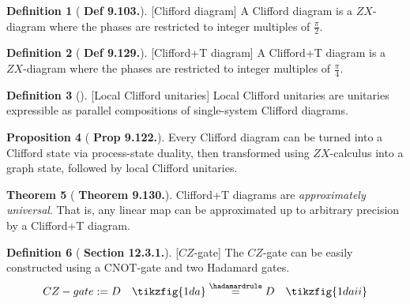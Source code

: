 \documentclass[11pt]{article} %
\theoremstyle{definition}
\newtheorem{theorem}{Theorem}[section]
\newtheorem{corollary}[theorem]{Corollary}
\newtheorem{proposition}[theorem]{Proposition}
\newtheorem{definition}[theorem]{Definition}
\begin{document}
\begin{definition}[{\cite{coecke2017picturing} \textbf{Def 9.103.}}][Clifford diagram]
A Clifford diagram is a $ZX$-diagram where the phases are restricted to integer multiples of $\frac{\pi}{2}$.
\label{def:2}
\end{definition}

\begin{definition}[{\cite{coecke2017picturing} \textbf{Def 9.129.}}][Clifford+T diagram]
A Clifford+T diagram is a $ZX$-diagram where the phases are restricted to integer multiples of $\frac{\pi}{4}$.
\label{def:3}
\end{definition}

\begin{definition}[{\cite{coecke2017picturing}}][Local Clifford unitaries]
Local Clifford unitaries are unitaries expressible as parallel compositions of single-system Clifford diagrams.
\label{def:4}
\end{definition}

\begin{proposition}[{\cite{coecke2017picturing} \textbf{Prop 9.122.}}]
Every Clifford diagram can be turned into a Clifford state via process-state duality,
then transformed using $ZX$-calculus into a graph state, followed by local Clifford unitaries.
\label{prop:1}
\end{proposition}



\begin{theorem}[{\cite{coecke2017picturing} \textbf{Theorem 9.130.}}]
Clifford+T diagrams are \textit{approximately universal}. 
That is, any linear map can be approximated up to arbitrary precision by a Clifford+T diagram.
\label{thm:1}
\end{theorem}


\begin{definition}[{\cite{coecke2017picturing} \textbf{Section 12.3.1.}}][$CZ$-gate]
The $CZ$-gate can be easily constructed using a CNOT-gate and two Hadamard gates.
\[CZ-gate:=D\quad\tikzfig{1da}\stackrel{\hadamardrule}{=}D\quad\tikzfig{1daii}\]
\end{definition}
\end{document}
